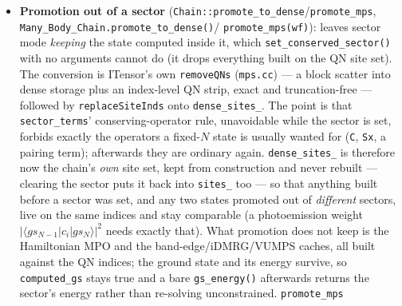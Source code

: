 \documentclass[11pt]{article}
\begin{document}
\begin{itemize}
\begin{itemize}
        excited states, not just \texttt{set\_hamiltonian}. Both helpers
        are pass-through when no sector is set, which is what keeps the
        default path byte-identical.
    \end{itemize}
    On the Python side the sector lives on the chain
    (\texttt{Many\_Body\_Chain.conserved\_sector}), is re-applied
    whenever a session is rebuilt (\texttt{sites.py::initialize},
    \texttt{\_\_deepcopy\_\_}/\texttt{clone}), is part of
    \texttt{groundstate.py}'s Hamiltonian-send cache key, and is checked
    in \texttt{mode.py} against the solver that will actually answer:
    DMRG on \texttt{itensor\_version=2}/\texttt{"julia\_live"}
    \emph{raises}, since those have no quantum numbers and would silently
    return the global ground state instead of the sector's, while a
    fallback to ED is fine because ED targets the sector too.
  \item \textbf{Promotion out of a sector}
    (\texttt{Chain::promote\_to\_dense}/\texttt{promote\_mps},
    \texttt{Many\_Body\_Chain.promote\_to\_dense()}/
    \texttt{promote\_mps(wf)}): leaves sector mode \emph{keeping} the
    state computed inside it, which \texttt{set\_conserved\_sector()}
    with no arguments cannot do (it drops everything built on the QN site
    set). The conversion is ITensor's own \texttt{removeQNs}
    (\texttt{mps.cc}) --- a block scatter into dense storage plus an
    index-level QN strip, exact and truncation-free --- followed by
    \texttt{replaceSiteInds} onto \texttt{dense\_sites\_}. The point is
    that \texttt{sector\_terms}' conserving-operator rule, unavoidable
    while the sector is set, forbids exactly the operators a fixed-$N$
    state is usually wanted for (\texttt{C}, \texttt{Sx}, a pairing
    term); afterwards they are ordinary again. \texttt{dense\_sites\_} is
    therefore now the chain's \emph{own} site set, kept from construction
    and never rebuilt --- clearing the sector puts it back into
    \texttt{sites\_} too --- so that anything built before a sector was
    set, and any two states promoted out of \emph{different} sectors,
    live on the same indices and stay comparable (a photoemission weight
    $|\langle gs_{N-1}|c_i|gs_N\rangle|^2$ needs exactly that). What
    promotion does not keep is the Hamiltonian MPO and the
    band-edge/iDMRG/VUMPS caches, all built against the QN indices; the
    ground state and its energy survive, so \texttt{computed\_gs} stays
    true and a bare \texttt{gs\_energy()} afterwards returns the sector's
    energy rather than re-solving unconstrained. \texttt{promote\_mps}

\end{itemize}
\end{document}
